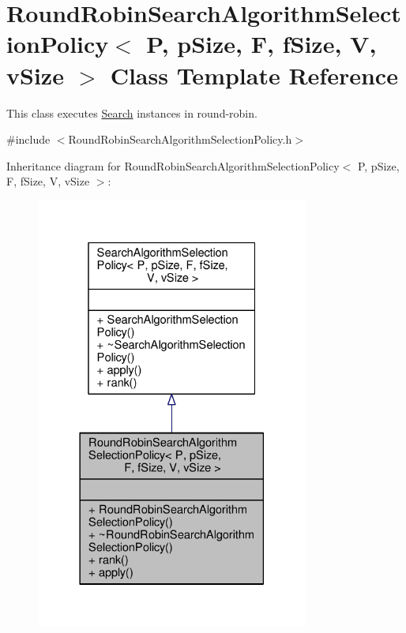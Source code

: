 \hypertarget{classRoundRobinSearchAlgorithmSelectionPolicy}{}\section{Round\+Robin\+Search\+Algorithm\+Selection\+Policy$<$ P, p\+Size, F, f\+Size, V, v\+Size $>$ Class Template Reference}
\label{classRoundRobinSearchAlgorithmSelectionPolicy}


This class executes \hyperlink{classSearch}{Search} instances in round-\/robin.  




{\ttfamily \#include $<$Round\+Robin\+Search\+Algorithm\+Selection\+Policy.\+h$>$}



Inheritance diagram for Round\+Robin\+Search\+Algorithm\+Selection\+Policy$<$ P, p\+Size, F, f\+Size, V, v\+Size $>$\+:
\nopagebreak
\begin{figure}[H]
\begin{center}
\leavevmode
\includegraphics[width=254pt]{classRoundRobinSearchAlgorithmSelectionPolicy__inherit__graph}
\end{center}
\end{figure}


